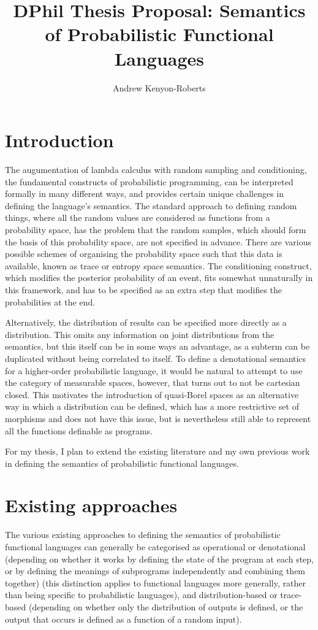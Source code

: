 \documentclass[titlepage]{article}
\title{DPhil Thesis Proposal: Semantics of Probabilistic Functional Languages}
\author{Andrew Kenyon-Roberts}
\begin{document}
\maketitle
\section{Introduction}
The augumentation of lambda calculus with random sampling and conditioning, the fundamental constructs of probabilistic programming, can be interpreted formally in many different ways, and provides certain unique challenges in defining the language's semantics. The standard approach to defining random things, where all the random values are considered as functions from a probability space, has the problem that the random samples, which should form the basis of this probability space, are not specified in advance. There are various possible schemes of organising the probability space such that this data is available, known as trace or entropy space semantics. The conditioning construct, which modifies the posterior probability of an event, fits somewhat unnaturally in this framework, and has to be specified as an extra step that modifies the probabilities at the end.

Alternatively, the distribution of results can be specified more directly as a distribution. This omits any information on joint distributions from the semantics, but this itself can be in some ways an advantage, as a subterm can be duplicated without being correlated to itself. To define a denotational semantics for a higher-order probabilistic language, it would be natural to attempt to use the category of measurable spaces, however, that turns out to not be cartesian closed. This motivates the introduction of quasi-Borel spaces \cite{8005137} as an alternative way in which a distribution can be defined, which has a more restrictive set of morphisms and does not have this issue, but is nevertheless still able to represent all the functions definable as programs.

For my thesis, I plan to extend the existing literature and my own previous work in defining the semantics of probabilistic functional languages.


\section{Existing approaches}
The various existing approaches to defining the semantics of probabilistic functional languages can generally be categorised as operational or denotational (depending on whether it works by defining the state of the program at each step, or by defining the meanings of subprograms independently and combining them together) (this distinction applies to functional languages more generally, rather than being specific to probabilistic languages), and distribution-based or trace-based (depending on whether only the distribution of outputs is defined, or the output that occurs is defined as a function of a random input).
\end{document}
